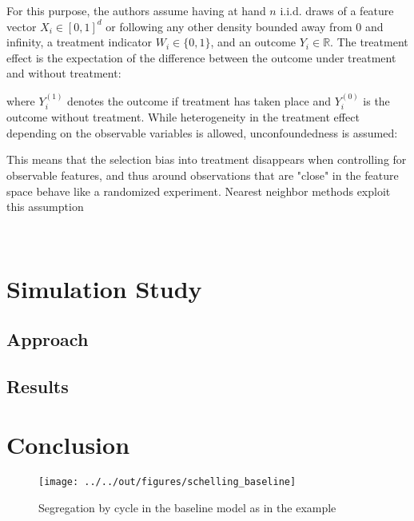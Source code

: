 \documentclass[11pt, a4paper, leqno]{article}
\begin{document}
For this purpose, the authors assume having at hand \(n\) i.i.d. draws of a feature vector \(X_i \in [0,1]^d\) or following any other density bounded away from 0 and infinity, a treatment indicator \(W_i \in \{0,1\}\), and an outcome \(Y_i \in \mathbb{R}\).
The treatment effect is the expectation of the difference between the outcome under treatment and without treatment:

where \(Y_i^{(1)}\) denotes the outcome if treatment has taken place and \(Y_i^{(0)}\) is the outcome without treatment.
While heterogeneity in the treatment effect depending on the observable variables is allowed, unconfoundedness is assumed:

This means that the selection bias into treatment disappears when controlling for observable features, and thus around observations that are "close" in the feature space behave like a randomized experiment. Nearest neighbor methods exploit this assumption
\(\) \(\) \(\) 







 \(\) \(\) \(\) \(\) \(\) 


\section{Simulation Study} %
\label{sec:simulation}

\subsection{Approach} %
\label{sec:sim_approach}



\subsection{Results} %
\label{sec:sim_results}
    




\section{Conclusion} %
\label{sec:conclusion}




\begin{figure}
    \caption{Segregation by cycle in the baseline \citet{Schelling69} model as in the \citet{StachurskiSargent13} example}
    
    \texttt{[image: ../../out/figures/schelling\_baseline]}

\end{figure}
\end{document}
